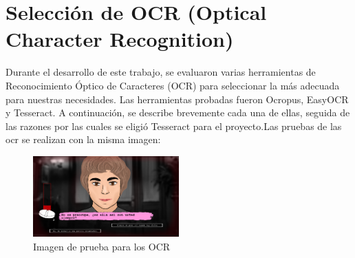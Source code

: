 \section{Selección de OCR (Optical Character Recognition)}
Durante el desarrollo de este trabajo, se evaluaron varias herramientas de Reconocimiento Óptico de Caracteres (OCR) para seleccionar la más adecuada para nuestras necesidades. Las herramientas probadas fueron Ocropus, EasyOCR y Tesseract. A continuación, se describe brevemente cada una de ellas, seguida de las razones por las cuales se eligió Tesseract para el proyecto.Las pruebas de las ocr se realizan con la misma imagen:
\begin{figure}[h]
	\centering
	\includegraphics[width = 0.5\textwidth]{Imagenes/OCR/GameScene.png}
	\caption{Imagen de prueba para los OCR}
\end{figure}
